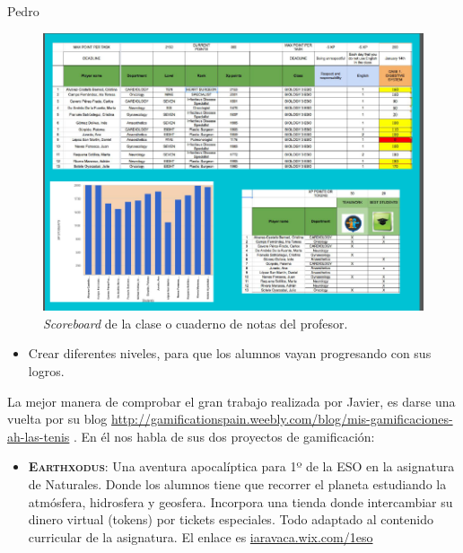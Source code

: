 \begin{opin}{\pedrocolor}{Pedro}
\begin{leftbar}{\pedrocolor}
\begin{itemize}
\end{itemize}
\vspace{2cm}
\end{leftbar}
\vspace{-2cm}
\begin{figure}[hpbt]
\begin{leftbar}{\pedrocolor}
\centering
\includegraphics[scale=0.35]{img/gamingpedro3.png}
\caption{\textit{Scoreboard} de la clase o cuaderno de notas del profesor.}
\label{fig:scoreboard}
\vspace{4cm}
\end{leftbar}
\vspace{-4cm}
\end{figure}
\begin{leftbar}{\pedrocolor}

\begin{itemize}
\vspace{-1.2cm}
\item Crear diferentes niveles, para que los alumnos vayan progresando con sus logros. 

\end{itemize}



La mejor manera de comprobar el gran trabajo realizada por Javier, es darse una vuelta por su blog \url{http://gamificationspain.weebly.com/blog/mis-gamificaciones-ah-las-tenis} . En él nos habla de sus dos proyectos de gamificación:

\begin{itemize}

\item \textbf{\textsc{Earthxodus}}: Una aventura apocalíptica para 1º de la ESO en la asignatura de Naturales. Donde los alumnos tiene que recorrer el planeta estudiando la atmósfera, hidrosfera y geosfera. Incorpora una tienda donde intercambiar su dinero virtual (tokens) por tickets especiales. Todo adaptado al contenido curricular de la asignatura. El enlace es \url{iaravaca.wix.com/1eso}


\end{itemize}
\end{leftbar}
\end{opin}
